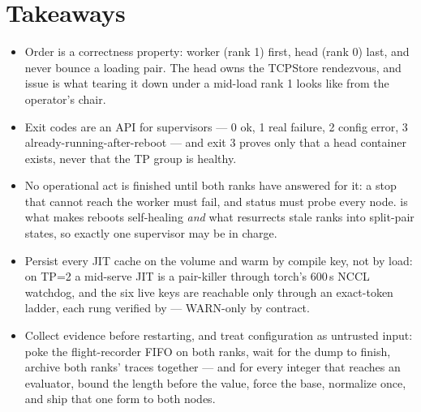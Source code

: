 \section*{Takeaways}
\begin{itemize}
  \item Order is a correctness property: worker (rank 1) first, head
    (rank 0) last, and never bounce a loading pair. The head owns the
    TCPStore rendezvous, and issue  is what tearing it down
    under a mid-load rank 1 looks like from the operator's chair.
  \item Exit codes are an API for supervisors --- 0 ok, 1 real failure, 2
    config error, 3 already-running-after-reboot --- and exit 3 proves only
    that a head container exists, never that the TP group is healthy.
  \item No operational act is finished until both ranks have answered for
    it: a stop that cannot reach the worker must fail, and status must
    probe every node.  is what makes reboots
    self-healing \emph{and} what resurrects stale ranks into split-pair
    states, so exactly one supervisor may be in charge.
  \item Persist every JIT cache on the volume and warm by compile key, not
    by load: on TP=2 a mid-serve JIT is a pair-killer through torch's
    600\,s NCCL watchdog, and the six live  keys are
    reachable only through an exact-token ladder, each rung verified by
     --- WARN-only by contract.
  \item Collect evidence before restarting, and treat configuration as
    untrusted input: poke the flight-recorder FIFO on both ranks, wait for
    the dump to finish, archive both ranks' traces together --- and for
    every integer that reaches an evaluator, bound the length before the
    value, force the base, normalize once, and ship that one form to both
    nodes.
\end{itemize}

